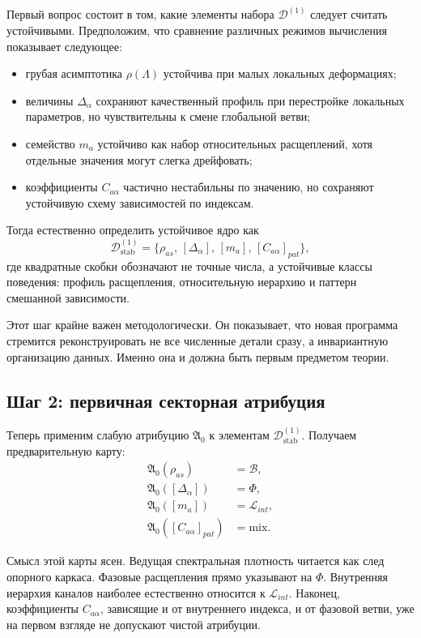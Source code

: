 \documentclass[12pt,a4paper]{article}
\begin{document}
Первый вопрос состоит в том, какие элементы набора \(\mathcal{D}^{(1)}\) следует считать устойчивыми. Предположим, что сравнение различных режимов вычисления показывает следующее:
\begin{itemize}
    \item грубая асимптотика \(\rho(\Lambda)\) устойчива при малых локальных деформациях;
    \item величины \(\Delta_{\alpha}\) сохраняют качественный профиль при перестройке локальных параметров, но чувствительны к смене глобальной ветви;
    \item семейство \(m_a\) устойчиво как набор относительных расщеплений, хотя отдельные значения могут слегка дрейфовать;
    \item коэффициенты \(C_{a\alpha}\) частично нестабильны по значению, но сохраняют устойчивую схему зависимостей по индексам.
\end{itemize}

Тогда естественно определить устойчивое ядро как
\begin{equation}
\mathcal{D}^{(1)}_{\mathrm{stab}} = \{\rho_{as},\, [\Delta_{\alpha}],\, [m_a],\, [C_{a\alpha}]_{pat}\},
\end{equation}
где квадратные скобки обозначают не точные числа, а устойчивые классы поведения: профиль расщепления, относительную иерархию и паттерн смешанной зависимости.

Этот шаг крайне важен методологически. Он показывает, что новая программа стремится реконструировать не все численные детали сразу, а инвариантную организацию данных. Именно она и должна быть первым предметом теории.

\subsection{Шаг 2: первичная секторная атрибуция}

Теперь применим слабую атрибуцию \(\mathfrak{A}_0\) к элементам \(\mathcal{D}^{(1)}_{\mathrm{stab}}\). Получаем предварительную карту:
\begin{align}
\mathfrak{A}_0(\rho_{as}) &= \mathcal{B}, \\
\mathfrak{A}_0([\Delta_{\alpha}]) &= \Phi, \\
\mathfrak{A}_0([m_a]) &= \mathcal{L}_{int}, \\
\mathfrak{A}_0([C_{a\alpha}]_{pat}) &= \mathrm{mix}.
\end{align}

Смысл этой карты ясен. Ведущая спектральная плотность читается как след опорного каркаса. Фазовые расщепления прямо указывают на \(\Phi\). Внутренняя иерархия каналов наиболее естественно относится к \(\mathcal{L}_{int}\). Наконец, коэффициенты \(C_{a\alpha}\), зависящие и от внутреннего индекса, и от фазовой ветви, уже на первом взгляде не допускают чистой атрибуции.
\end{document}
